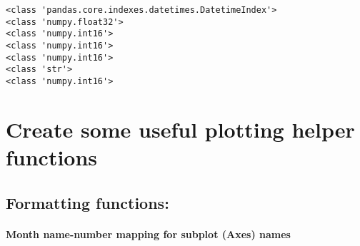 \documentclass[11pt]{article}
\begin{document}
    \begin{Verbatim}[commandchars=\\\{\}]
<class 'pandas.core.indexes.datetimes.DatetimeIndex'>
<class 'numpy.float32'>
<class 'numpy.int16'>
<class 'numpy.int16'>
<class 'numpy.int16'>
<class 'str'>
<class 'numpy.int16'>
    \end{Verbatim}

    \section{Create some useful plotting helper
functions}\label{create-some-useful-plotting-helper-functions}

    \subsection{Formatting functions:}\label{formatting-functions}

    \paragraph{Month name-number mapping for subplot (Axes)
names}\label{month-name-number-mapping-for-subplot-axes-names}
\end{document}
